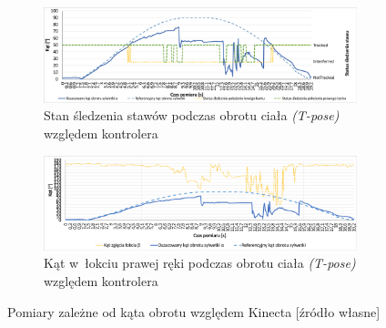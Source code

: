 \begin{savenotes}
	\begin{figure}[!htb]
		\captionsetup{singlelinecheck=off}
		\centering
		\begin{subfigure}[b]{0.8\textwidth}
			\centering
			\includegraphics[width=\linewidth]{images/kinectRotation.png}	
			\caption{Stan śledzenia stawów podczas obrotu ciała \emph{(T-pose)} względem kontrolera}
			\label{fig:characteristics:kinect:bodyRotationChart}
		\end{subfigure}
																																												
		\begin{subfigure}[b]{0.8\textwidth}
			\centering
			\includegraphics[width=\linewidth]{images/kinectRightHandElbowAngle.png}		
			\caption{Kąt w~łokciu prawej ręki podczas obrotu ciała \emph{(T-pose)} względem kontrolera}
			\label{fig:characteristics:kinect:kinectRightHandElbowAngle}
		\end{subfigure}				
		\caption{Pomiary zależne od kąta obrotu względem Kinecta [źródło własne]}
	\end{figure}
\end{savenotes}
																																					
																																					

